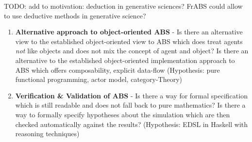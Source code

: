 TODO: add to motivation: deduction in generative sciences? FrABS could allow to use deductive methods in generative science?

\begin{enumerate}
	\item \textbf{Alternative approach to object-oriented ABS} - Is there an alternative view to the established object-oriented view to ABS which does treat agents \textit{not} like objects and does not mix the concept of agent and object? Is there an alternative to the established object-oriented implementation approach to ABS which offers composability, explicit data-flow (Hypothesis: pure functional programming, actor model, category-Theory)
	\item \textbf{Verification \& Validation of ABS} - Is there a way for formal specification which is still readable and does not fall back to pure mathematics? Is there a way to formally specify hypotheses about the simulation which are then checked automatically against the results? (Hypothesis: EDSL in Haskell with reasoning techniques)
\end{enumerate}